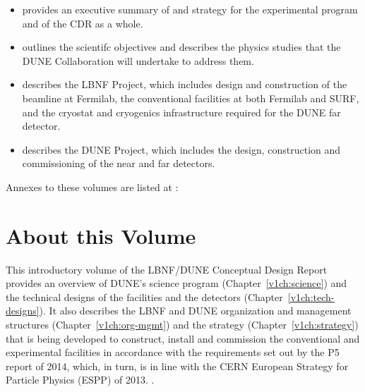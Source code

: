 \begin{itemize}
\item \volintro provides an executive summary of and strategy for the experimental program and of the CDR as a whole.
\item \volphys outlines the scientifc objectives and describes the physics studies that the DUNE Collaboration will undertake to address them.
\item \vollbnf describes the LBNF Project, which includes design and construction of the beamline at Fermilab, the conventional facilities at both Fermilab and SURF, and the cryostat and cryogenics infrastructure required for the DUNE far detector.
\item \voldune describes the DUNE Project, which includes the design, construction and commissioning of the near and far detectors. 
\end{itemize}
Annexes to these volumes are listed at :



\section{About this Volume}

This introductory volume of the LBNF/DUNE Conceptual Design Report provides an overview of DUNE's science program (Chapter~\ref{v1ch:science}) and the technical designs of the facilities and the detectors 
(Chapter~\ref{v1ch:tech-designs}). It also describes the LBNF and DUNE organization and management structures 
(Chapter~\ref{v1ch:org-mgmt}) and the strategy (Chapter~\ref{v1ch:strategy})  that is being developed to construct, install and commission the conventional and experimental facilities in accordance with the requirements set out by the P5 report of 2014, which, in turn, is in line with the CERN
European Strategy for Particle Physics (ESPP) of 2013. .

